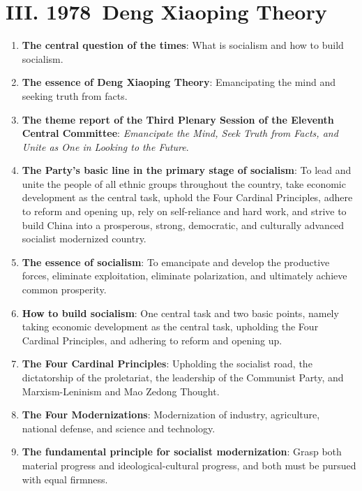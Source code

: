 \documentclass[11pt,a4paper]{ctexart}
\begin{document}
\section{III. 1978~Deng Xiaoping Theory}

\begin{enumerate}[leftmargin=2em]
    \item \textbf{The central question of the times}: What is socialism and how to build socialism.
    
    \item \textbf{The essence of Deng Xiaoping Theory}: Emancipating the mind and seeking truth from facts.
    
    \item \textbf{The theme report of the Third Plenary Session of the Eleventh Central Committee}: \textit{Emancipate the Mind, Seek Truth from Facts, and Unite as One in Looking to the Future}.
    
    \item \textbf{The Party's basic line in the primary stage of socialism}: To lead and unite the people of all ethnic groups throughout the country, take economic development as the central task, uphold the Four Cardinal Principles, adhere to reform and opening up, rely on self-reliance and hard work, and strive to build China into a prosperous, strong, democratic, and culturally advanced socialist modernized country.
    
    \item \textbf{The essence of socialism}: To emancipate and develop the productive forces, eliminate exploitation, eliminate polarization, and ultimately achieve common prosperity.
    
    \item \textbf{How to build socialism}: One central task and two basic points, namely taking economic development as the central task, upholding the Four Cardinal Principles, and adhering to reform and opening up.
    
    \item \textbf{The Four Cardinal Principles}: Upholding the socialist road, the dictatorship of the proletariat, the leadership of the Communist Party, and Marxism-Leninism and Mao Zedong Thought.
    
    \item \textbf{The Four Modernizations}: Modernization of industry, agriculture, national defense, and science and technology.
    
    \item \textbf{The fundamental principle for socialist modernization}: Grasp both material progress and ideological-cultural progress, and both must be pursued with equal firmness.
\end{enumerate}
\end{document}
